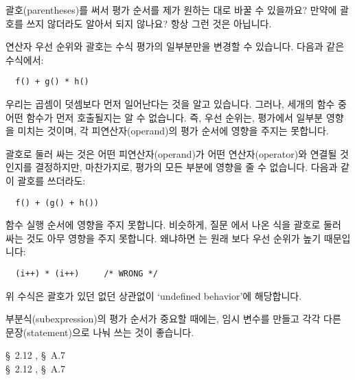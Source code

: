 \begin{faq}
	괄호(parentheses)를 써서 평가 순서를 제가 원하는 대로 바꿀 수 있을까요?
	만약에 괄호를 쓰지 않더라도 알아서 되지 않나요?
\A
	항상 그런 것은 아닙니다.

	연산자 우선 순위와 괄호는 수식 평가의 일부분만을 변경할 수 있습니다.
	다음과 같은 수식에서:

\begin{verbatim}
  f() + g() * h()
\end{verbatim}

	우리는 곱셈이 덧셈보다 먼저 일어난다는 것을 알고 있습니다.
	그러나, 세개의 함수 중 어떤 함수가 먼저 호출될지는 알 수 없습니다.
        즉, 우선 순위는, 평가에서 일부분 영향을 미치는 것이며, 각 피연산자(operand)의
        평가 순서에 영향을 주지는 못합니다.

        괄호로 둘러 싸는 것은 어떤 피연산자(operand)가 어떤 연산자(operator)와
        연결될 것인지를 결정하지만, 마찬가지로, 평가의 모든 부분에 영향을 줄 수 없습니다.
        다음과 같이 괄호를 쓰더라도:
\begin{verbatim}
  f() + (g() + h())
\end{verbatim}
        함수 실행 순서에 영향을 주지 못합니다. 비슷하게, 질문 에서 나온 식을
        괄호로 둘러 싸는 것도 아무 영향을 주지 못합니다. 왜냐하면 \TT{++}는 원래
        \TT{*}보다 우선 순위가 높기 때문입니다:
\begin{verbatim}
  (i++) * (i++)     /* WRONG */
\end{verbatim}
        위 수식은 괄호가 있던 없던 상관없이 `undefined behavior'에 해당합니다.

	부분식(subexpression)의 평가 순서가 중요할 때에는, 임시 변수를 만들고
	각각 다른 문장(statement)으로 나눠 쓰는 것이 좋습니다.

\R
	\cite{kr1} \S\ 2.12 , \S\ A.7  \\
	\cite{kr2} \S\ 2.12 , \S\ A.7 
\end{faq}

